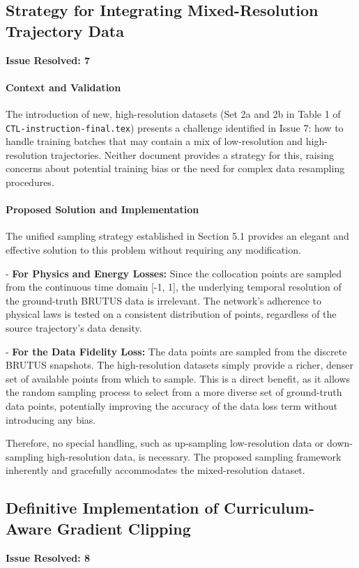 \documentclass[11pt, a4paper]{article}
\begin{document}
\subsection{Strategy for Integrating Mixed-Resolution Trajectory Data}
\textbf{Issue Resolved: 7}
\paragraph{Context and Validation}
The introduction of new, high-resolution datasets (Set 2a and 2b in Table 1 of \texttt{CTL-instruction-\allowbreak final.tex}) presents a challenge identified in Issue 7: how to handle training batches that may contain a mix of low-resolution and high-resolution trajectories. Neither document provides a strategy for this, raising concerns about potential training bias or the need for complex data resampling procedures.

\paragraph{Proposed Solution and Implementation}
The unified sampling strategy established in Section 5.1 provides an elegant and effective solution to this problem without requiring any modification.

    
- \textbf{For Physics and Energy Losses:} Since the collocation points are sampled from the continuous time domain [-1, 1], the underlying temporal resolution of the ground-truth BRUTUS data is irrelevant. The network's adherence to physical laws is tested on a consistent distribution of points, regardless of the source trajectory's data density.
    
- \textbf{For the Data Fidelity Loss:} The data points are sampled from the discrete BRUTUS snapshots. The high-resolution datasets simply provide a richer, denser set of available points from which to sample. This is a direct benefit, as it allows the random sampling process to select from a more diverse set of ground-truth data points, potentially improving the accuracy of the data loss term without introducing any bias.

Therefore, no special handling, such as up-sampling low-resolution data or down-sampling high-resolution data, is necessary. The proposed sampling framework inherently and gracefully accommodates the mixed-resolution dataset.

\subsection{Definitive Implementation of Curriculum-Aware Gradient Clipping}
\textbf{Issue Resolved: 8}
\end{document}
